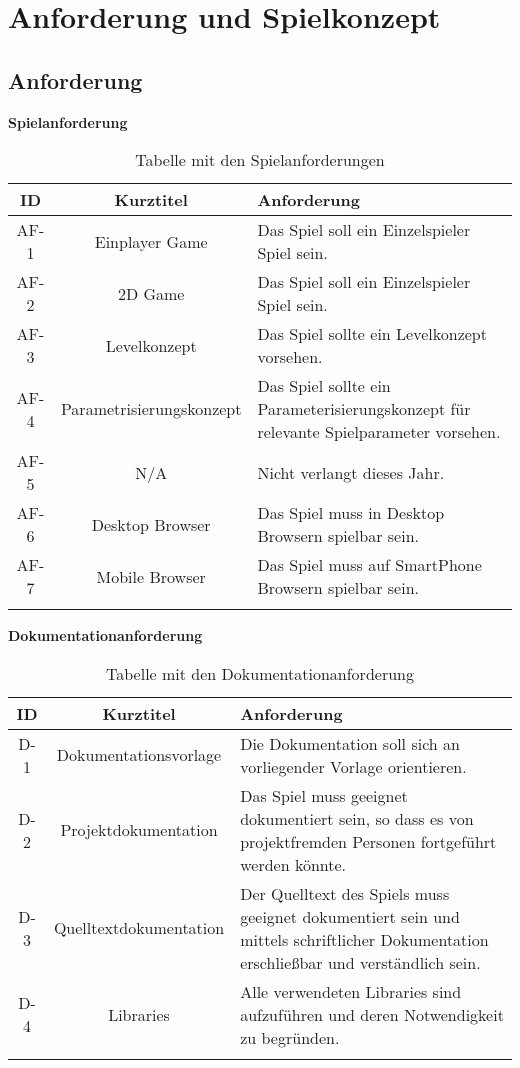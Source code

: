 \documentclass[a4paper,10pt]{report}
\begin{document}
  
    \newpage
    \chapter{Anforderung und Spielkonzept}
    \section{Anforderung}
	{
		\label{sec:requirements}
		\noindent \hspace{2mm}
		\textbf{Spielanforderung}
		\begin{longtable}{|c|c|p{}|}
		\hline
		\textbf{ID} & \textbf{Kurztitel} & \textbf{Anforderung} \\
		\hline
		AF-1 & Einplayer Game & Das Spiel soll ein Einzelspieler Spiel sein. \\
		\hline
		AF-2 & 2D Game & Das Spiel soll ein Einzelspieler Spiel sein. \\
		\hline
		AF-3 & Levelkonzept & Das Spiel sollte ein Levelkonzept vorsehen. \\
		\hline
		AF-4 & Parametrisierungskonzept & Das Spiel sollte ein Parameterisierungskonzept für relevante Spielparameter vorsehen. \\
		\hline
		AF-5 & N/A & Nicht verlangt dieses Jahr. \\
		\hline
		AF-6 & Desktop Browser & Das Spiel muss in Desktop Browsern spielbar sein. \\
		\hline
		AF-7 & Mobile Browser & Das Spiel muss auf SmartPhone Browsern spielbar sein. \\
		\hline
		\caption{Tabelle mit den Spielanforderungen}
		\end{longtable}
		
		\noindent \hspace{2mm}
		\textbf{Dokumentationanforderung}
		
		\begin{longtable}{|c|c|p{}|}
		\hline
		\textbf{ID} & \textbf{Kurztitel} & \textbf{Anforderung} \\
		\hline
		D-1 & Dokumentationsvorlage & Die Dokumentation soll sich an vorliegender Vorlage orientieren. \\
		\hline
		D-2 & Projektdokumentation & Das Spiel muss geeignet dokumentiert sein, so dass es von projektfremden Personen fortgeführt werden könnte. \\
		\hline
		D-3 & Quelltextdokumentation & Der Quelltext des Spiels muss geeignet dokumentiert sein und mittels schriftlicher Dokumentation erschließbar und verständlich sein. \\
		\hline
		D-4 & Libraries & Alle verwendeten Libraries sind aufzuführen und deren Notwendigkeit zu begründen. \\
		\hline
		\caption{Tabelle mit den Dokumentationanforderung}
		\end{longtable}
		
}
\end{document}
